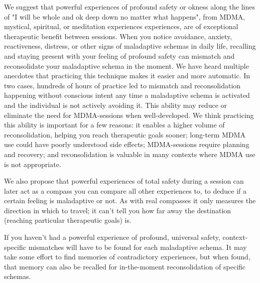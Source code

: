 \documentclass[12pt,letterpaper]{article}
\begin{document}
We suggest that powerful experiences of profound safety or okness along the lines of "I will be whole and ok deep down no matter what happens", from MDMA, mystical, spiritual, or meditation experiences experiences, are of exceptional therapeutic benefit between sessions. When you notice avoidance, anxiety, reactiveness, distress, or other signs of maladaptive schemas in daily life, recalling and staying present with your feeling of profound safety can mismatch and reconsolidate your maladaptive schema in the moment. We have heard multiple anecdotes that practicing this technique makes it easier and more automatic. In two cases, hundreds of hours of practice led to mismatch and reconsolidation happening without conscious intent any time a maladaptive schema is activated and the individual is not actively avoiding it. This ability may reduce or eliminate the need for MDMA-sessions when well-developed. We think practicing this ability is important for a few reasons: it enables a higher volume of reconsolidation, helping you reach therapeutic goals sooner; long-term MDMA use could have poorly understood side effects; MDMA-sessions require planning and recovery; and reconsolidation is valuable in many contexts where MDMA use is not appropriate.

We also propose that powerful experiences of total safety during a session can later act as a compass you can compare all other experiences to, to deduce if a certain feeling is maladaptive or not. As with real compasses it only measures the direction in which to travel; it can’t tell you how far away the destination (reaching particular therapeutic goals) is.

If you haven't had a powerful experience of profound, universal safety, context-specific mismatches will have to be found for each maladaptive schema.  It may take some effort to find memories of contradictory experiences, but when found, that memory can also be recalled for in-the-moment reconsolidation of specific schemas.

\end{document}
